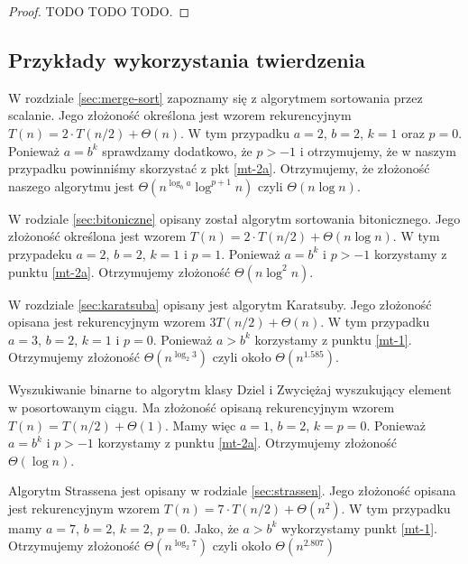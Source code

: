\begin{proof}
 TODO TODO TODO.
\end{proof}

\subsection{Przykłady wykorzystania twierdzenia}

W rozdziale \ref{sec:merge-sort} zapoznamy się z algorytmem sortowania przez scalanie.
Jego złożoność określona jest wzorem rekurencyjnym $T(n) = 2 \cdot T(n/2) + \Theta(n)$.
W tym przypadku $a = 2$, $b = 2$, $k = 1$ oraz $p = 0$.
Ponieważ $a = b^k$ sprawdzamy dodatkowo, że $p > -1$ i otrzymujemy, że w naszym przypadku powinniśmy skorzystać z pkt \ref{mt-2a}.
Otrzymujemy, że złożoność naszego algorytmu jest $\Theta(n^{\log_b a} \log^{p + 1} n)$ czyli $\Theta(n\log n)$.

W rodziale \ref{sec:bitoniczne} opisany został algorytm sortowania bitonicznego.
Jego złożoność określona jest wzorem $T(n) = 2 \cdot T(n/2) + \Theta(n \log n)$.
W tym przypadeku $a = 2$, $b = 2$, $k=1$ i $p = 1$.
Ponieważ $a = b^k$ i $p > -1$ korzystamy z punktu \ref{mt-2a}.
Otrzymujemy złożoność $\Theta(n \log^2 n)$.

W rozdziale \ref{sec:karatsuba} opisany jest algorytm Karatsuby. Jego złożoność opisana jest rekurencyjnym wzorem $3 T(n/2) + \Theta(n)$.
W tym przypadku $a = 3$, $b = 2$, $k=1$ i $p=0$.
Ponieważ $a > b^k$ korzystamy z punktu \ref{mt-1}.
Otrzymujemy złożoność $\Theta(n^{\log_{2} 3})$ czyli około $\Theta(n^{1.585}).$

Wyszukiwanie binarne to algorytm klasy Dziel i Zwyciężaj wyszukujący element w posortowanym ciągu.
Ma złożoność opisaną rekurencyjnym wzorem $T(n) = T(n/2) + \Theta(1)$.
Mamy więc $a = 1$, $b = 2$, $k = p = 0$.
Ponieważ $a = b^k$ i $p > -1$ korzystamy z punktu \ref{mt-2a}.
Otrzymujemy złożoność $\Theta(\log n)$.

Algorytm Strassena jest opisany w rodziale \ref{sec:strassen}.
Jego złożoność opisana jest rekurencyjnym wzorem $T(n) = 7 \cdot T(n/2) + \Theta(n^2)$.
W tym przypadku mamy $a = 7$, $b = 2$, $k = 2$, $p = 0$.
Jako, że $a > b^k$ wykorzystamy punkt \ref{mt-1}.
Otrzymujemy złożoność $\Theta(n^{\log_{2} 7})$ czyli około $\Theta(n^{2.807})$
